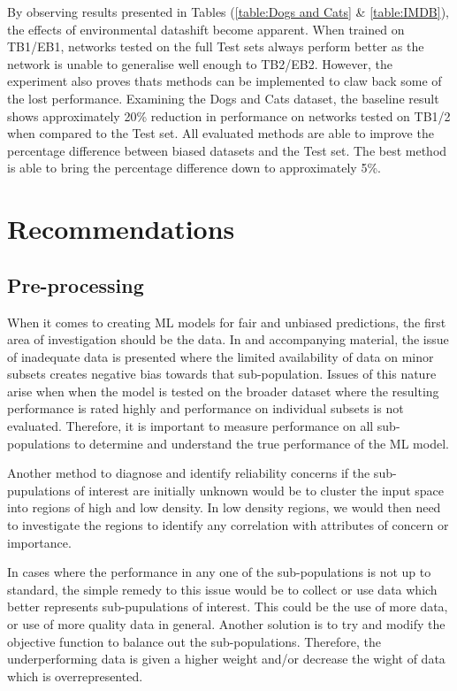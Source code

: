 By observing results presented in Tables (\ref{table:Dogs and Cats} \& \ref{table:IMDB}), the effects of environmental datashift become apparent.
When trained on TB1/EB1, networks tested on the full Test sets always perform better as the network is unable to generalise well enough to TB2/EB2.
However, the experiment also proves thats methods can be implemented to claw back some of the lost performance. 
Examining the Dogs and Cats dataset, the baseline result shows approximately 20\% reduction in performance on networks tested on TB1/2 when compared to the Test set.
All evaluated methods are able to improve the percentage difference between biased datasets and the Test set. 
The best method is able to bring the percentage difference down to approximately 5\%.

\pagebreak
\section{Recommendations}
\subsection{Pre-processing} 
When it comes to creating ML models for fair and unbiased predictions, the first area of investigation should be the data.
In \cite{saria2019tutorial} and accompanying material, the issue of inadequate data is presented where the limited availability of data on minor subsets creates negative bias towards that sub-population.
Issues of this nature arise when when the model is tested on the broader dataset where the resulting performance is rated highly and performance on individual subsets is not evaluated.
Therefore, it is important to measure performance on all sub-populations to determine and understand the true performance of the ML model.

Another method to diagnose and identify reliability concerns if the sub-pupulations of interest are initially unknown 
would be to cluster the input space into regions of high and low density.
In low density regions, we would then need to investigate the regions to identify any correlation with attributes of concern or importance.

In cases where the performance in any one of the sub-populations is not up to standard, the simple remedy to this issue would be to collect or use data which better represents sub-pupulations of interest.
This could be the use of more data, or use of more quality data in general.
Another solution is to try and modify the objective function to balance out the sub-populations. 
Therefore, the underperforming data is given a higher weight and/or decrease the wight of data which is overrepresented. 

